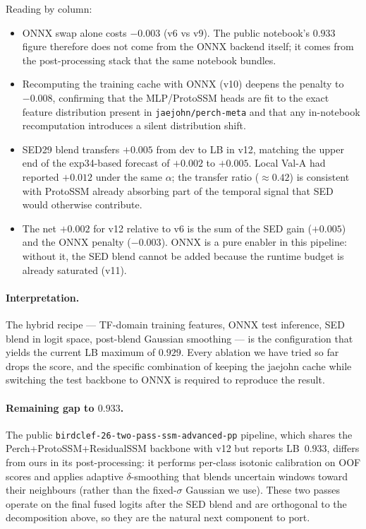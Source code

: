 Reading by column:
\begin{itemize}
\item ONNX swap alone costs $-0.003$ (v6 vs v9). The public notebook's
$0.933$ figure therefore does not come from the ONNX backend itself;
it comes from the post-processing stack that the same notebook bundles.
\item Recomputing the training cache with ONNX (v10) deepens the
penalty to $-0.008$, confirming that the MLP/ProtoSSM heads are fit
to the exact feature distribution present in
\texttt{jaejohn/perch-meta} and that any in-notebook recomputation
introduces a silent distribution shift.
\item SED29 blend transfers $+0.005$ from dev to LB in v12, matching
the upper end of the exp34-based forecast of $+0.002$ to $+0.005$.
Local Val-A had reported $+0.012$ under the same $\alpha$; the
transfer ratio ($\approx 0.42$) is consistent with ProtoSSM already
absorbing part of the temporal signal that SED would otherwise
contribute.
\item The net $+0.002$ for v12 relative to v6 is the sum of the
SED gain ($+0.005$) and the ONNX penalty ($-0.003$). ONNX is a
pure enabler in this pipeline: without it, the SED blend cannot be
added because the runtime budget is already saturated (v11).
\end{itemize}

\paragraph{Interpretation.}
The hybrid recipe
--- TF-domain training features, ONNX test inference, SED blend
in logit space, post-blend Gaussian smoothing ---
is the configuration that yields the current LB maximum of $0.929$.
Every ablation we have tried so far drops the score, and the
specific combination of keeping the jaejohn cache while switching
the test backbone to ONNX is required to reproduce the result.

\paragraph{Remaining gap to $0.933$.}
The public \texttt{birdclef-26-two-pass-ssm-advanced-pp} pipeline,
which shares the Perch+ProtoSSM+ResidualSSM backbone with v12 but
reports LB~$0.933$, differs from ours in its post-processing: it
performs per-class isotonic calibration on OOF scores and
applies adaptive $\delta$-smoothing that blends uncertain windows
toward their neighbours (rather than the fixed-$\sigma$ Gaussian we
use). These two passes operate on the final fused logits after the
SED blend and are orthogonal to the decomposition above, so they
are the natural next component to port.


